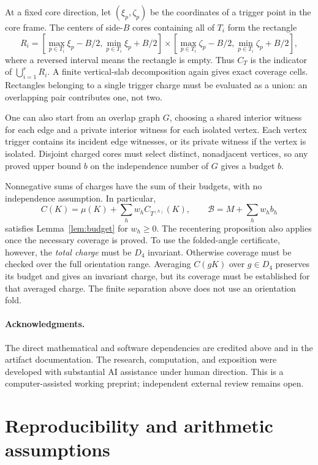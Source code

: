 \documentclass[11pt]{article}
\begin{document}
At a fixed core direction, let $(\xi_p,\zeta_p)$ be the coordinates of a
trigger point in the core frame. The centers of side-$B$ cores containing
all of $T_i$ form the rectangle
\[
  R_i=\left[\max_{p\in T_i}\xi_p-B/2,
             \min_{p\in T_i}\xi_p+B/2\right]
       \times
       \left[\max_{p\in T_i}\zeta_p-B/2,
             \min_{p\in T_i}\zeta_p+B/2\right],
\]
where a reversed interval means the rectangle is empty. Thus $C_T$ is the
indicator of $\bigcup_{i=1}^rR_i$. A finite vertical-slab decomposition again
gives exact coverage cells. Rectangles belonging to a single trigger charge
must be evaluated as a union: an overlapping pair contributes one, not two.

One can also start from an overlap graph $G$, choosing a shared interior
witness for each edge and a private interior witness for each isolated vertex.
Each vertex trigger contains its incident edge witnesses, or its private
witness if the vertex is isolated. Disjoint charged
cores must select distinct, nonadjacent vertices, so any proved upper bound
$b$ on the independence number of $G$ gives a budget $b$.

Nonnegative sums of charges have the sum of their budgets, with no
independence assumption. In particular,
\[
  C(K)=\mu(K)+\sum_h w_h C_{T^{(h)}}(K),\qquad
  \mathcal B=M+\sum_h w_h b_h
\]
satisfies Lemma~\ref{lem:budget} for $w_h\ge0$. The recentering proposition
also applies once the necessary coverage is proved. To use the folded-angle
certificate, however, the \emph{total charge} must be $D_4$ invariant.
Otherwise coverage must be checked over the full orientation range. Averaging
$C(gK)$ over $g\in D_4$ preserves its budget and gives an invariant charge,
but its coverage must be established for that averaged charge. The finite
separation above does not use an orientation fold.

\paragraph{Acknowledgments.}
The direct mathematical and software dependencies are credited above and in
the artifact documentation. The research, computation, and exposition were
developed with substantial AI assistance under human direction. This is a
computer-assisted working preprint; independent external review remains open.

\appendix
\section{Reproducibility and arithmetic assumptions}\label{app:replay}
\end{document}
